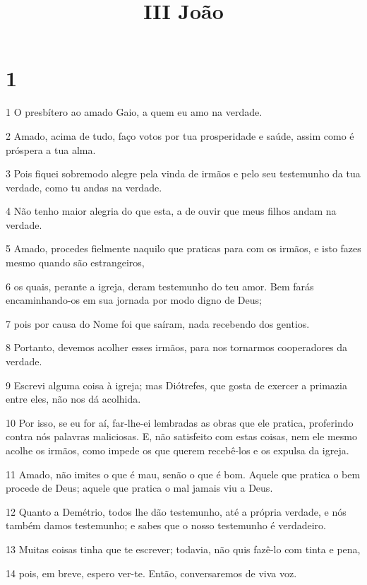 

\title{III João}


\chapter{1}

\par 1 O presbítero ao amado Gaio, a quem eu amo na verdade.
\par 2 Amado, acima de tudo, faço votos por tua prosperidade e saúde, assim como é próspera a tua alma.
\par 3 Pois fiquei sobremodo alegre pela vinda de irmãos e pelo seu testemunho da tua verdade, como tu andas na verdade.
\par 4 Não tenho maior alegria do que esta, a de ouvir que meus filhos andam na verdade.
\par 5 Amado, procedes fielmente naquilo que praticas para com os irmãos, e isto fazes mesmo quando são estrangeiros,
\par 6 os quais, perante a igreja, deram testemunho do teu amor. Bem farás encaminhando-os em sua jornada por modo digno de Deus;
\par 7 pois por causa do Nome foi que saíram, nada recebendo dos gentios.
\par 8 Portanto, devemos acolher esses irmãos, para nos tornarmos cooperadores da verdade.
\par 9 Escrevi alguma coisa à igreja; mas Diótrefes, que gosta de exercer a primazia entre eles, não nos dá acolhida.
\par 10 Por isso, se eu for aí, far-lhe-ei lembradas as obras que ele pratica, proferindo contra nós palavras maliciosas. E, não satisfeito com estas coisas, nem ele mesmo acolhe os irmãos, como impede os que querem recebê-los e os expulsa da igreja.
\par 11 Amado, não imites o que é mau, senão o que é bom. Aquele que pratica o bem procede de Deus; aquele que pratica o mal jamais viu a Deus.
\par 12 Quanto a Demétrio, todos lhe dão testemunho, até a própria verdade, e nós também damos testemunho; e sabes que o nosso testemunho é verdadeiro.
\par 13 Muitas coisas tinha que te escrever; todavia, não quis fazê-lo com tinta e pena,
\par 14 pois, em breve, espero ver-te. Então, conversaremos de viva voz.


